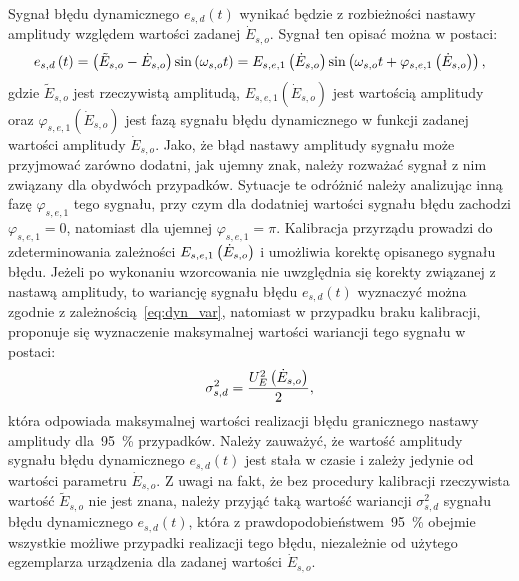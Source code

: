 Sygnał błędu dynamicznego $e_{s,d}(t)$ wynikać będzie z rozbieżności nastawy amplitudy względem wartości zadanej $\dot{E}_{s,o}$. Sygnał ten opisać można w postaci:
\begin{equation}
e_{s,d} \left(t\right) = \left(\tilde{E}_{s,o} - \dot{E}_{s,o}\right) \sin \left(\omega_{s,o} t\right) = E_{s,e,1} \left(\dot{E}_{s,o}\right) \sin \left(\omega_{s,o} t + \varphi_{s,e,1} \left(\dot{E}_{s,o}\right)\right) \label{eq:pom_gen_err_dyn_mono},
\end{equation}
gdzie $\tilde{E}_{s,o}$ jest rzeczywistą amplitudą, $E_{s,e,1}(\dot{E}_{s,o})$ jest wartością amplitudy oraz $\varphi_{s,e,1}(\dot{E}_{s,o})$ jest fazą sygnału błędu dynamicznego w funkcji zadanej wartości amplitudy $\dot{E}_{s,o}$. Jako, że błąd nastawy amplitudy sygnału może przyjmować zarówno dodatni, jak ujemny znak, należy rozważać sygnał z nim związany dla obydwóch przypadków. Sytuacje te odróżnić należy analizując inną fazę $\varphi_{s,e,1}$ tego sygnału, przy czym dla dodatniej wartości sygnału błędu zachodzi $\varphi_{s,e,1} = 0$, natomiast dla ujemnej $\varphi_{s,e,1} = \pi$. Kalibracja przyrządu prowadzi do zdeterminowania zależności $E_{s,e,1} \left(\dot{E}_{s,o}\right)$ i umożliwia korektę opisanego sygnału błędu. Jeżeli po wykonaniu wzorcowania nie uwzględnia się korekty związanej z nastawą amplitudy, to wariancję sygnału błędu $e_{s,d}(t)$ wyznaczyć można zgodnie z zależnością~\eqref{eq:dyn_var}, natomiast w przypadku braku kalibracji, proponuje się wyznaczenie maksymalnej wartości wariancji tego sygnału w postaci:
\begin{equation}
\sigma_{s,d}^{2} = \frac{U_{E}^{2} \left(\dot{E}_{s,o}\right)}{2} \label{eq:pom_gen_var_dyn},
\end{equation}
która odpowiada maksymalnej wartości realizacji błędu granicznego nastawy amplitudy dla~\qty{95}{\percent} przypadków. Należy zauważyć, że wartość amplitudy sygnału błędu dynamicznego $e_{s,d}(t)$ jest stała w czasie i zależy jedynie od wartości parametru $\dot{E}_{s,o}$. Z uwagi na fakt, że bez procedury kalibracji rzeczywista wartość $\tilde{E}_{s,o}$ nie jest znana, należy przyjąć taką wartość wariancji $\sigma_{s,d}^{2}$ sygnału błędu dynamicznego $e_{s,d}(t)$, która z prawdopodobieństwem~\qty{95}{\percent} obejmie wszystkie możliwe przypadki realizacji tego błędu, niezależnie od użytego egzemplarza urządzenia dla zadanej wartości $\dot{E}_{s,o}$.

